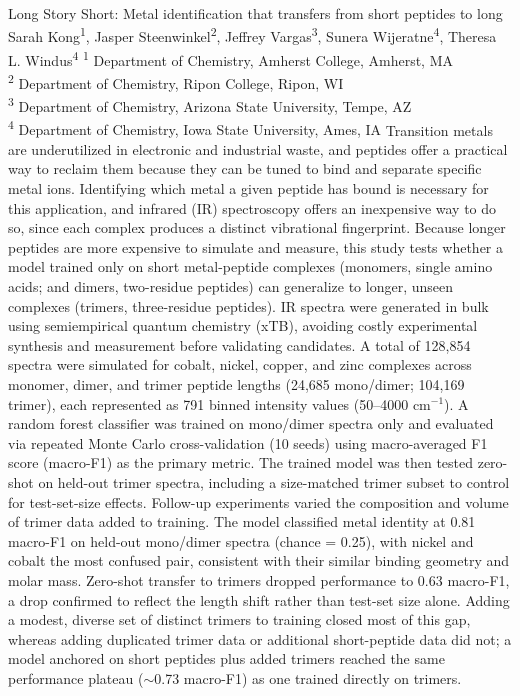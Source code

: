 \makeabstract
    {
    Long Story Short: Metal identification that transfers from short peptides to long
    }
    {
    Sarah Kong\textsuperscript{1}, Jasper Steenwinkel\textsuperscript{2}, Jeffrey Vargas\textsuperscript{3}, Sunera Wijeratne\textsuperscript{4}, Theresa L. Windus\textsuperscript{4}
    }
    {
    \textsuperscript{1} Department of Chemistry, Amherst College, Amherst, MA\\
\textsuperscript{2} Department of Chemistry, Ripon College, Ripon, WI\\
\textsuperscript{3} Department of Chemistry, Arizona State University, Tempe, AZ\\
\textsuperscript{4} Department of Chemistry, Iowa State University, Ames, IA
    }
    {
    Transition metals are underutilized in electronic and industrial waste, and peptides offer a practical way to reclaim them because they can be tuned to bind and separate specific metal ions. Identifying which metal a given peptide has bound is necessary for this application, and infrared (IR) spectroscopy offers an inexpensive way to do so, since each complex produces a distinct vibrational fingerprint. Because longer peptides are more expensive to simulate and measure, this study tests whether a model trained only on short metal-peptide complexes (monomers, single amino acids; and dimers, two-residue peptides) can generalize to longer, unseen complexes (trimers, three-residue peptides).
    }
    {
    IR spectra were generated in bulk using semiempirical quantum chemistry (xTB), avoiding costly experimental synthesis and measurement before validating candidates. A total of 128,854 spectra were simulated for cobalt, nickel, copper, and zinc complexes across monomer, dimer, and trimer peptide lengths (24,685 mono/dimer; 104,169 trimer), each represented as 791 binned intensity values (50--4000 cm$^{-1}$). A random forest classifier was trained on mono/dimer spectra only and evaluated via repeated Monte Carlo cross-validation (10 seeds) using macro-averaged F1 score (macro-F1) as the primary metric. The trained model was then tested zero-shot on held-out trimer spectra, including a size-matched trimer subset to control for test-set-size effects. Follow-up experiments varied the composition and volume of trimer data added to training.
    }
    {
    The model classified metal identity at 0.81 macro-F1 on held-out mono/dimer spectra (chance = 0.25), with nickel and cobalt the most confused pair, consistent with their similar binding geometry and molar mass. Zero-shot transfer to trimers dropped performance to 0.63 macro-F1, a drop confirmed to reflect the length shift rather than test-set size alone. Adding a modest, diverse set of distinct trimers to training closed most of this gap, whereas adding duplicated trimer data or additional short-peptide data did not; a model anchored on short peptides plus added trimers reached the same performance plateau ($\sim$0.73 macro-F1) as one trained directly on trimers.
    }
